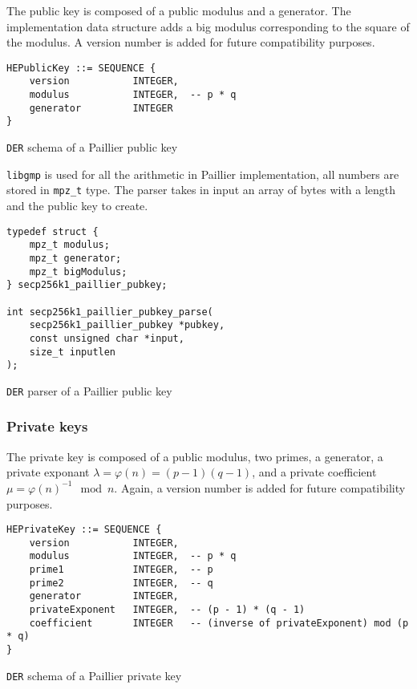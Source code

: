 The public key is composed of a public modulus and a generator. The
implementation data structure adds a big modulus corresponding to the square of
the modulus. A version number is added for future compatibility purposes.

\begin{listing}
  \begin{verbatim}
HEPublicKey ::= SEQUENCE {
    version           INTEGER,
    modulus           INTEGER,  -- p * q
    generator         INTEGER
}
  \end{verbatim}
	\caption{\texttt{DER} schema of a Paillier public key}
	\label{lst:DERSchemaPaillierPub}
\end{listing}

\texttt{libgmp} is used for all the arithmetic in Paillier implementation, all
numbers are stored in \texttt{mpz\_t} type. The parser takes in input an array
of bytes with a length and the public key to create.

\begin{listing}
  \begin{verbatim}
typedef struct {
    mpz_t modulus;
    mpz_t generator;
    mpz_t bigModulus;
} secp256k1_paillier_pubkey;

int secp256k1_paillier_pubkey_parse(
    secp256k1_paillier_pubkey *pubkey,
    const unsigned char *input,
    size_t inputlen
);
  \end{verbatim}
	\caption{\texttt{DER} parser of a Paillier public key}
	\label{lst:DERImplPaillierParsePub}
\end{listing}


\subsubsection{Private keys}

The private key is composed of a public modulus, two primes, a generator, a
private exponant $\lambda = \varphi(n) = (p-1)(q-1)$, and a private coefficient
$\mu = \varphi(n)^{-1} \mod n$. Again, a version number is added for future
compatibility purposes.

\begin{listing}
  \begin{verbatim}
HEPrivateKey ::= SEQUENCE {
    version           INTEGER,
    modulus           INTEGER,  -- p * q
    prime1            INTEGER,  -- p
    prime2            INTEGER,  -- q
    generator         INTEGER,
    privateExponent   INTEGER,  -- (p - 1) * (q - 1)
    coefficient       INTEGER   -- (inverse of privateExponent) mod (p * q)
}
  \end{verbatim}
	\caption{\texttt{DER} schema of a Paillier private key}
	\label{lst:DERSchemaPaillierPriv}
\end{listing}

